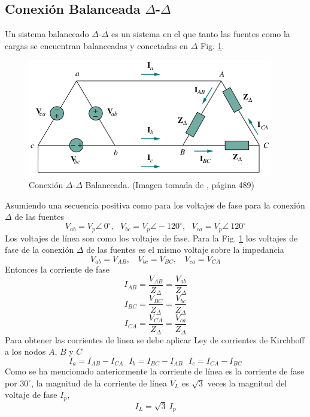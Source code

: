 \documentclass[twocolumn]{IEEEtran}
\begin{document}
\subsection{Conexión Balanceada $\Delta$-$\Delta$}
\noindent
Un sistema balanceado $\Delta$-$\Delta$ es un sistema en el que tanto las fuentes como la cargas se encuentran balanceadas y conectadas en $\Delta$ Fig. \ref{fig11}.
\begin{figure}[H]
	\centering
		\includegraphics[scale=0.6]{deltadelta.png}
	\caption{Conexión $\Delta$-$\Delta$ Balanceada. (Imagen tomada de \cite{sadiku}, página 489)}
	\label{fig11}
\end{figure}
\noindent
Asumiendo una secuencia positiva como para los voltajes de fase para la conexión $\Delta$ de las fuentes
\begin{equation}
 V_{ab} = V_p \angle\ 0^\circ,\ \ \ V_{bc} = V_p \angle -120^\circ,\ \ \ V_{ca} = V_p \angle\ 120^\circ
\label{ecu28}
\end{equation}
\noindent
Los voltajes de línea son como los voltajes de fase. Para la Fig. \ref{fig11} los voltajes de fase de la conexión $\Delta$ de las fuentes es el mismo voltaje sobre la impedancia
\begin{equation}
 V_{ab} = V_{AB}, \ \ \ \ V_{bc} = V_{BC}, \ \ \ \ V_{ca} = V_{CA}
\label{ecu29}
\end{equation}
\noindent
Entonces la corriente de fase
\begin{equation}
 I_{AB} = \frac{V_{AB}}{Z_{\Delta}} = \frac{V_{ab}}{Z_{\Delta}}
\label{ecu30}
\end{equation}
\begin{equation}
 I_{BC} = \frac{V_{BC}}{Z_{\Delta}} = \frac{V_{bc}}{Z_{\Delta}}
\label{ecu31}
\end{equation}
\begin{equation}
 I_{CA} = \frac{V_{CA}}{Z_{\Delta}} = \frac{V_{ca}}{Z_{\Delta}}
\label{ecu32}
\end{equation}
\noindent
Para obtener las corrientes de linea se debe aplicar Ley de corrientes de Kirchhoff a los nodos $A$, $B$ y $C$
\begin{equation}
 I_a = I_{AB} - I_{CA} \ \ \ I_b = I_{BC} - I_{AB} \ \ \ I_c = I_{CA} - I_{BC}
\label{ecu33}
\end{equation}
\noindent
Como se ha mencionado anteriormente la corriente de línea es la corriente de fase por $30 ^\circ$, la magnitud de la corriente de línea $V_L$ es $\sqrt{3}$ veces la magnitud del voltaje de fase $I_p$,
\begin{equation}
 I_L = \sqrt{3}\ I_p
\label{ecu34}
\end{equation}
\end{document}
